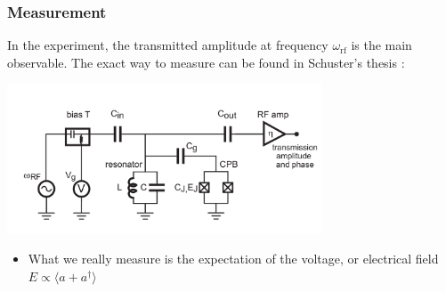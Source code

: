 \documentclass[xcolor=dvipsnames,hyperref={CJKbookmarks=true}]{beamer}
\newcommand{\rf}{\text{rf}}
\begin{document}
\begin{frame}[t]\frametitle{Measurement}
In the experiment, the transmitted amplitude at frequency $\omega_{\rf}$ is the 
main observable. The exact way to measure can be found in Schuster's thesis \cite{schuster2007circuit}: 
\begin{center}
  \includegraphics[width=0.7\textwidth]{measurement.png}
\end{center}
	\begin{itemize}
		\item What we really measure is the expectation of the voltage, or 
		electrical field $E\propto\langle a + a^\dag \rangle$
	\end{itemize}
\end{frame}
\end{document}
